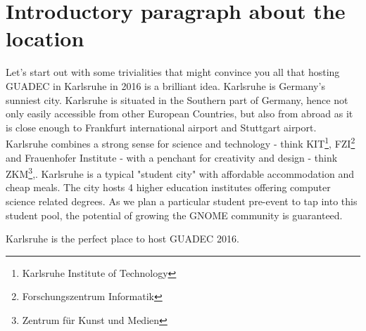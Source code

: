 \section{Introductory paragraph about the location}

Let's start out with some trivialities that might convince you all that hosting GUADEC in Karlsruhe in 2016 is a brilliant idea. Karlsruhe is Germany's sunniest city. Karlsruhe is situated in the Southern part of Germany, hence not only easily accessible from other European Countries, but also from abroad as it is close enough to Frankfurt international airport and Stuttgart airport. Karlsruhe combines a strong sense for science and technology - think KIT\footnote{Karlsruhe Institute of Technology}, FZI\footnote{Forschungszentrum Informatik} and Frauenhofer Institute - with a penchant for creativity and design - think ZKM\footnote{Zentrum für Kunst und Medien},. Karlsruhe is a typical "student city" with affordable accommodation and cheap meals. The city hosts 4 higher education institutes offering computer science related degrees. As we plan a particular student pre-event to tap into this student pool, the potential of growing the GNOME community is guaranteed.  

Karlsruhe is the perfect place to host GUADEC 2016. 

